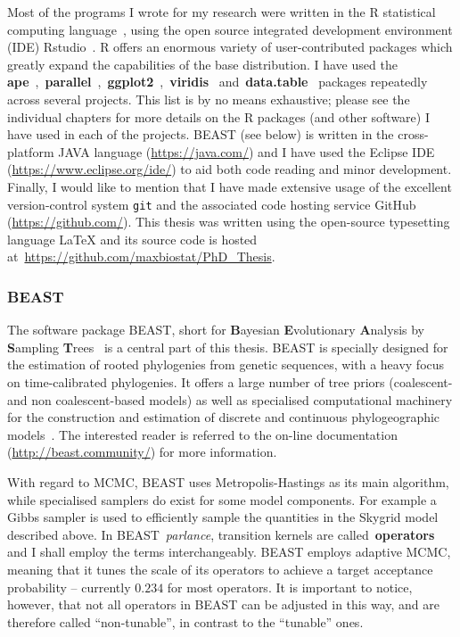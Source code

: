 Most of the programs I wrote for my research were written in the R statistical computing language~\citep{R2017}, using the open source integrated development environment (IDE) Rstudio~\citep{Rstudio2015}.
R offers an enormous variety of user-contributed packages which greatly expand the capabilities of the base distribution. 
I have used the \textbf{ape}~\citep{Paradis2004},~\textbf{parallel}~\citep{R2017},~\textbf{ggplot2}~\citep{Wickham2009},~\textbf{viridis}~\citep{Garnier2018} and~\textbf{data.table}~\citep{Dowle2017} packages repeatedly across several projects.
This list is by no means exhaustive; please see the individual chapters for more details on the R packages (and other software) I have used in each of the projects.
BEAST (see below) is written in the cross-platform JAVA language (\url{https://java.com/}) and I have used the Eclipse IDE (\url{https://www.eclipse.org/ide/}) to aid both code reading and minor development.
Finally, I would like to mention that I have made extensive usage of the excellent version-control system \verb|git| and the associated code hosting service GitHub (\url{https://github.com/}).
This thesis was written using the open-source typesetting language \LaTeX\: and its source code is hosted at~\url{https://github.com/maxbiostat/PhD_Thesis}.

\subsubsection{BEAST}
\label{sec:beast}

The software package BEAST, short for \textbf{B}ayesian \textbf{E}volutionary \textbf{A}nalysis by \textbf{S}ampling \textbf{T}rees~\citep{Drummond2007,Drummond2012,Suchard2018} is a central part of this thesis.
BEAST is specially designed for the estimation of rooted phylogenies from genetic sequences, with a heavy focus on time-calibrated phylogenies.
It offers a large number of tree priors (coalescent- and non coalescent-based models) as well as specialised computational machinery for the construction and estimation of discrete and continuous phylogeographic models~\citep{Lemey2009,Lemey2010,Pybus2012,Dudas2017}.
The interested reader is referred to the on-line documentation (\url{http://beast.community/}) for more information.

With regard to MCMC, BEAST uses Metropolis-Hastings as its main algorithm, while specialised samplers do exist for some model components.
For example  a Gibbs sampler is used to efficiently sample the quantities in the Skygrid model described above.
In BEAST~\textit{parlance}, transition kernels are called~\textbf{operators} and I shall employ the terms interchangeably. 
BEAST employs adaptive MCMC, meaning that it tunes the scale of its operators to achieve a target acceptance probability -- currently $0.234$ for most operators.
It is important to notice, however, that not all operators in BEAST can be adjusted in this way, and are therefore called ``non-tunable'', in contrast to the ``tunable'' ones.

